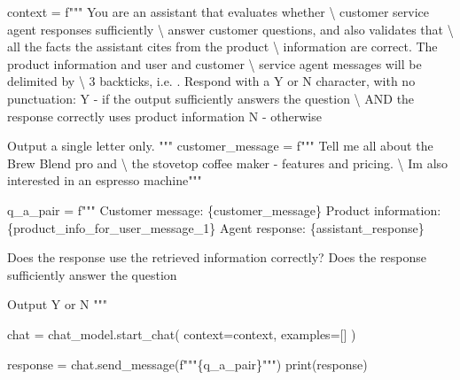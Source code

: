 \documentclass[
  letterpaper,
  DIV=11,
  numbers=noendperiod]{scrreprt}
\newenvironment{Shaded}{\begin{snugshade}}{\end{snugshade}}
\newcommand{\BuiltInTok}[1]{\textcolor[rgb]{0.00,0.23,0.31}{#1}}
\newcommand{\CharTok}[1]{\textcolor[rgb]{0.13,0.47,0.30}{#1}}
\newcommand{\NormalTok}[1]{\textcolor[rgb]{0.00,0.23,0.31}{#1}}
\newcommand{\OperatorTok}[1]{\textcolor[rgb]{0.37,0.37,0.37}{#1}}
\newcommand{\SpecialCharTok}[1]{\textcolor[rgb]{0.37,0.37,0.37}{#1}}
\newcommand{\SpecialStringTok}[1]{\textcolor[rgb]{0.13,0.47,0.30}{#1}}
\begin{document}
\begin{Shaded}
\begin{Highlighting}[]
\NormalTok{context }\OperatorTok{=} \SpecialStringTok{f"""}
\SpecialStringTok{You are an assistant that evaluates whether }\CharTok{\textbackslash{}}
\SpecialStringTok{customer service agent responses sufficiently }\CharTok{\textbackslash{}}
\SpecialStringTok{answer customer questions, and also validates that }\CharTok{\textbackslash{}}
\SpecialStringTok{all the facts the assistant cites from the product }\CharTok{\textbackslash{}}
\SpecialStringTok{information are correct.}
\SpecialStringTok{The product information and user and customer }\CharTok{\textbackslash{}}
\SpecialStringTok{service agent messages will be delimited by }\CharTok{\textbackslash{}}
\SpecialStringTok{3 backticks, i.e. \textasciigrave{}\textasciigrave{}\textasciigrave{}.}
\SpecialStringTok{Respond with a Y or N character, with no punctuation:}
\SpecialStringTok{Y {-} if the output sufficiently answers the question }\CharTok{\textbackslash{}}
\SpecialStringTok{AND the response correctly uses product information}
\SpecialStringTok{N {-} otherwise}

\SpecialStringTok{Output a single letter only.}
\SpecialStringTok{"""}
\NormalTok{customer\_message }\OperatorTok{=} \SpecialStringTok{f"""}
\SpecialStringTok{Tell me all about the Brew Blend pro and }\CharTok{\textbackslash{}}
\SpecialStringTok{the stovetop coffee maker {-} features and pricing. }\CharTok{\textbackslash{}}
\SpecialStringTok{I\textquotesingle{}m also interested in an espresso machine"""}

\NormalTok{q\_a\_pair }\OperatorTok{=} \SpecialStringTok{f"""}
\SpecialStringTok{Customer message: \textasciigrave{}\textasciigrave{}\textasciigrave{}}\SpecialCharTok{\{}\NormalTok{customer\_message}\SpecialCharTok{\}}\SpecialStringTok{\textasciigrave{}\textasciigrave{}\textasciigrave{}}
\SpecialStringTok{Product information: \textasciigrave{}\textasciigrave{}\textasciigrave{}}\SpecialCharTok{\{}\NormalTok{product\_info\_for\_user\_message\_1}\SpecialCharTok{\}}\SpecialStringTok{\textasciigrave{}\textasciigrave{}\textasciigrave{}}
\SpecialStringTok{Agent response: \textasciigrave{}\textasciigrave{}\textasciigrave{}}\SpecialCharTok{\{}\NormalTok{assistant\_response}\SpecialCharTok{\}}\SpecialStringTok{\textasciigrave{}\textasciigrave{}\textasciigrave{}}

\SpecialStringTok{Does the response use the retrieved information correctly?}
\SpecialStringTok{Does the response sufficiently answer the question}

\SpecialStringTok{Output Y or N}
\SpecialStringTok{"""}

\NormalTok{chat }\OperatorTok{=}\NormalTok{ chat\_model.start\_chat(}
\NormalTok{    context}\OperatorTok{=}\NormalTok{context,}
\NormalTok{    examples}\OperatorTok{=}\NormalTok{[]}
\NormalTok{)}

\NormalTok{response }\OperatorTok{=}\NormalTok{ chat.send\_message(}\SpecialStringTok{f"""}\SpecialCharTok{\{}\NormalTok{q\_a\_pair}\SpecialCharTok{\}}\SpecialStringTok{"""}\NormalTok{)}
\BuiltInTok{print}\NormalTok{(response)}
\end{Highlighting}
\end{Shaded}
\end{document}
